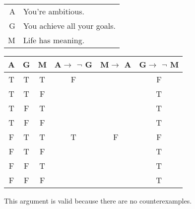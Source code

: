 \begin{tabular}{r l}
    A & You're ambitious. \\
    G & You achieve all your goals. \\
    M & Life has meaning.
\end{tabular}

\begin{tabular}{c|c|c||c|c||c}
    A & G & M & A$\rightarrow$ $\lnot$ G & M$\rightarrow$ A & G$\rightarrow$ $\lnot$ M \\
    \hline
    T & T & T & F &   & F \\
    T & T & F &   &   & T \\
    T & F & T &   &   & T \\
    T & F & F &   &   & T \\
    F & T & T & T & F & F \\
    F & T & F &   &   & T \\
    F & F & T &   &   & T \\
    F & F & F &   &   & T
\end{tabular}

\noindent This argument is valid because there are no counterexamples.